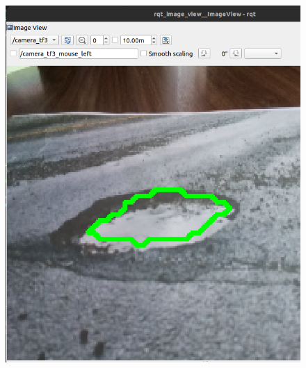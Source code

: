 \begin{figure}[ht!]
	\centering
	\begin{minipage}{0.4\linewidth}
		\centering
		\includegraphics[width=\linewidth]{figs/cap6/contornobache1.png}
	\end{minipage}
	\hspace{2 cm}
	\begin{minipage}{0.4\linewidth}
		\centering

\end{minipage}
\end{figure}
